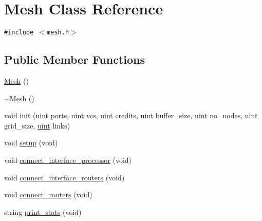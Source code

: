 \hypertarget{classMesh}{
\section{Mesh Class Reference}
\label{classMesh}
}
{\tt \#include $<$mesh.h$>$}

\subsection*{Public Member Functions}
\begin{CompactItemize}
\item 
\hyperlink{classMesh_2af137f1571af89172b9c102302c416b}{Mesh} ()
\item 
\hyperlink{classMesh_5efe4da1a4c0971cfb037bd70304c303}{$\sim$Mesh} ()
\item 
void \hyperlink{classMesh_678dc93df5115714b2d2e9a5932692db}{init} (\hyperlink{outputBuffer_8h_91ad9478d81a7aaf2593e8d9c3d06a14}{uint} ports, \hyperlink{outputBuffer_8h_91ad9478d81a7aaf2593e8d9c3d06a14}{uint} vcs, \hyperlink{outputBuffer_8h_91ad9478d81a7aaf2593e8d9c3d06a14}{uint} credits, \hyperlink{outputBuffer_8h_91ad9478d81a7aaf2593e8d9c3d06a14}{uint} buffer\_\-size, \hyperlink{outputBuffer_8h_91ad9478d81a7aaf2593e8d9c3d06a14}{uint} no\_\-nodes, \hyperlink{outputBuffer_8h_91ad9478d81a7aaf2593e8d9c3d06a14}{uint} grid\_\-size, \hyperlink{outputBuffer_8h_91ad9478d81a7aaf2593e8d9c3d06a14}{uint} links)
\item 
void \hyperlink{classMesh_5c83ba3ef93b8ab63084b9c45082c7e9}{setup} (void)
\item 
void \hyperlink{classMesh_9dfad9769d936905f5d8b0e4ffad6743}{connect\_\-interface\_\-processor} (void)
\item 
void \hyperlink{classMesh_0bee0b7a3c9b621524748a97a3575db7}{connect\_\-interface\_\-routers} (void)
\item 
void \hyperlink{classMesh_fea2e233774ea469b02cff87afc336bc}{connect\_\-routers} (void)
\item 
string \hyperlink{classMesh_eea84429f858784c6232e5633603fdf8}{print\_\-stats} (void)
\end{CompactItemize}
